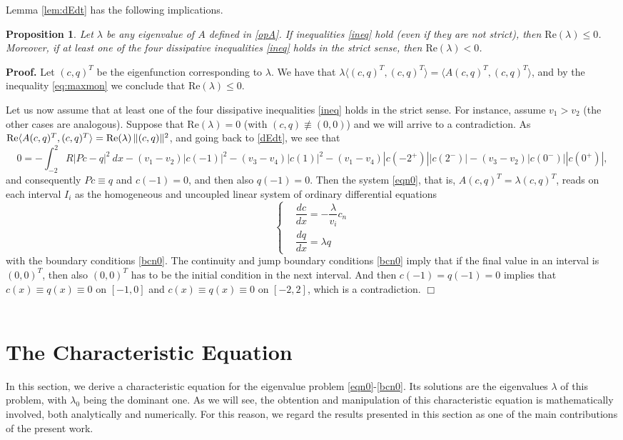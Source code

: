 \documentclass[a4paper]{article}
\newtheorem{prop}[thm]{Proposition}
\def\Re{{\textrm{Re}}}
\numberwithin{equation}{section}
\newenvironment{pf}{\vspace{0.5em}\noindent\textbf{Proof.} }{\quad \hfill $\Box$ \\ \vspace{0.2em}\\}
\begin{document}
Lemma \ref{lem:dEdt} has the following implications.
\begin{prop}\label{prop:Reneg}
Let $\lambda$ be any eigenvalue of $A$ defined in \eqref{opA}. If inequalities \eqref{ineq} hold (even if they are not strict), then $\Re(\lambda)\leq 0$. Moreover, if at least one of the four dissipative inequalities \eqref{ineq} holds in the strict sense, then $\Re(\lambda)<0$.
\end{prop}
\begin{pf}
Let $(c,q)^T$ be the eigenfunction corresponding to $\lambda$. We have that $\lambda\langle (c,q)^T, (c,q)^T\rangle= \langle A (c,q)^T,(c,q)^T\rangle$, and by the inequality \eqref{eq:maxmon}
we conclude that $\Re(\lambda)\leq 0$.

Let us now assume that at least one of the four dissipative inequalities \eqref{ineq} holds in the strict sense. For instance, assume $v_1>v_2$ (the other cases are analogous). Suppose that $\Re(\lambda)=0$ (with $(c,q)\not\equiv (0,0)$) and we will arrive to a contradiction. As ${\rm Re}\langle A(c,q)^T,(c,q)^T\rangle=\Re(\lambda)\,\|(c,q)\|^2$, and going back to \eqref{dEdt}, we see that
$$
0=-\int_{-2}^2R|Pc-q|^2\ dx-(v_1-v_2)|c(-1)|^2-(v_3-v_4)|c(1)|^2-(v_1-v_4)|c(-2^+)||c(2^-)|-(v_3-v_2)|c(0^-)||c(0^+)|,
$$
and consequently $Pc\equiv q$ and $c(-1)=0$, and then also $q(-1)=0$. Then the system \eqref{eqn0}, that is, $A(c,q)^T=\lambda(c,q)^T$, reads on each interval $I_i$ as the homogeneous and uncoupled linear system of ordinary differential equations
\begin{equation*}%
\left\{ \begin{array}{ll}
&\dfrac{dc}{dx}=-\dfrac{\lambda}{v_i} c_n  \\[10pt]
&\dfrac{dq}{dx} =\lambda q
\end{array}\right.
\end{equation*}
with the boundary conditions \eqref{bcn0}. The continuity and jump boundary conditions \eqref{bcn0} imply that if the final value in an interval is $(0,0)^T$, then also $(0,0)^T$ has to be the initial condition in the next interval. And then $c(-1)=q(-1)=0$ implies that $c(x)\equiv q(x)\equiv 0$ on $[-1,0]$ and $c(x)\equiv q(x)\equiv 0$ on $[-2,2]$, which is a contradiction.
\end{pf}
\section{The Characteristic Equation}\label{sec:carac}
In this section, we derive a characteristic equation for the eigenvalue problem \eqref{eqn0}-\eqref{bcn0}. Its solutions are the eigenvalues $\lambda$ of this problem, with $\lambda_0$ being the dominant one. As we will see, the obtention and manipulation of this characteristic equation is mathematically involved, both analytically and numerically. For this reason, we regard the results presented in this section as one of the main contributions of the present work.
\end{document}
